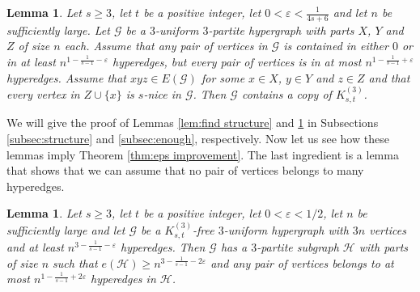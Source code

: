 \documentclass[a4paper,11pt]{article}
\newtheorem{lemma}[theorem]{\bf Lemma}
\theoremstyle{definition}
\def\eps{\varepsilon}
\def\cG{\mathcal{G}}
\def\cH{\mathcal{H}}
\begin{document}
\begin{lemma} \label{lem:structure enough}
   Let $s\geq 3$, let $t$ be a positive integer, let $0<\eps<\frac{1}{4s+6}$ and let $n$ be sufficiently large. Let $\cG$ be a $3$-uniform $3$-partite hypergraph with parts $X$, $Y$ and $Z$ of size $n$ each. Assume that any pair of vertices in $\cG$ is contained in either $0$ or in at least $n^{1-\frac{1}{s-1}-\eps}$ hyperedges, but every pair of vertices is in at most $n^{1-\frac{1}{s-1}+\eps}$ hyperedges. Assume that $xyz\in E(\cG)$ for some $x\in X$, $y\in Y$ and $z\in Z$ and that every vertex in $Z\cup \{x\}$ is $s$-nice in $\cG$. Then $\cG$ contains a copy of $K_{s,t}^{(3)}$.
\end{lemma}

We will give the proof of Lemmas \ref{lem:find structure} and \ref{lem:structure enough} in Subsections \ref{subsec:structure} and \ref{subsec:enough}, respectively. Now let us see how these lemmas imply Theorem \ref{thm:eps improvement}. The last ingredient is a lemma that shows that we can assume that no pair of vertices belongs to many hyperedges.

\begin{lemma} \label{lem:max degree}
   Let $s\geq 3$, let $t$ be a positive integer, let $0<\eps<1/2$, let $n$ be sufficiently large and let $\cG$ be a $K_{s,t}^{(3)}$-free $3$-uniform hypergraph with $3n$ vertices and at least $n^{3-\frac{1}{s-1}-\eps}$ hyperedges. Then $\cG$ has a $3$-partite subgraph $\cH$ with parts of size $n$ such that $e(\cH)\geq n^{3-\frac{1}{s-1}-2\eps}$ and any pair of vertices belongs to at most $n^{1-\frac{1}{s-1}+2\eps}$ hyperedges in $\cH$.
\end{lemma}
\end{document}
